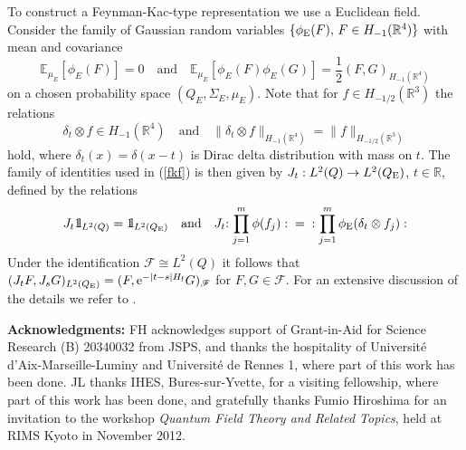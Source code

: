 \documentclass[11pt]{article}
\def\bbbone{{\mathchoice {\rm 1\mskip-4mu l} {\rm 1\mskip-4mu l}
{\rm 1\mskip-4.5mu l} {\rm 1\mskip-5mu l}}}
\def\one{\bbbone}
\newcommand{\Ebb}{{\mathbb E}}
\providecommand{\BR}{{\mathbb{R}^3 }}
\providecommand{\RR}{\mathbb{R}}
\providecommand{\kak}[1]{(\ref{#1})}
\providecommand{\fff}{\mathscr{F}}
\providecommand{\hf}{H_{\rm f}}
\providecommand{\half}{\frac{1}{2}}
\providecommand{\e}{{\rm e}}
\providecommand{\1}{\mathbb{1}}
\begin{document}
To construct a Feynman-Kac-type representation we use a Euclidean field. Consider the family of Gaussian random
variables $\{\phi_{\rm E}(F), \, F\in H_{-1}(\RR^4)\}$ with mean and covariance
$$
\Ebb_{\mu_E}[\phi_E(F)]=0 \quad \mbox{and} \quad \Ebb_{\mu_E}[\phi_E(F)\phi_E(G)]=\half (F, G)_{H_{-1}(\RR^4)}
$$
on a chosen probability space $(Q_E, \Sigma_E, \mu_E)$. Note that for $f\in H_{-1/2}(\BR)$ the relations
$$
\delta_t\otimes f\in H_{-1}(\RR^4) \quad  \mbox{and} \quad \|\delta_t\otimes f\|_{H_{-1}(\RR^4)} =
\|f\|_{H_{-1/2}(\BR)}
$$
hold, where $\delta_t(x) = \delta(x-t)$ is Dirac delta distribution with mass on $t$. The family of identities
used in \kak{fkf}
is  then given by $J_t: L^2(Q)\to L^2(Q_{\rm E})$, $t\in\RR$, defined by the relations
$$
J_t \one_{L^2(Q)}=\one_{L^2(Q_{\rm E})} \quad \mbox{and} \quad
J_t {:\prod_{j=1}^m \phi(f_j):} \;=\; {:\prod_{j=1}^m \phi_{\rm E}(\delta_t\otimes f_j):}
$$
Under the identification $\fff\cong L^2(Q)$ it follows that $(J_t F, J_s G)_{L^2(Q_{\rm E})}=
(F, \e^{-|t-s|\hf }G)_\fff$ for $F, G\in\fff$. For an extensive discussion of the details we refer to
\cite[Chapter 5]{lhb11}.


\bigskip
\noindent
{\bf Acknowledgments:}
FH acknowledges support of Grant-in-Aid for Science Research (B) 20340032 from JSPS,
and thanks the hospitality of Universit\'e d'Aix-Marseille-Luminy and  Universit\'e de
Rennes 1, where part of this work has been  done.
JL thanks IHES, Bures-sur-Yvette, for a visiting fellowship, where part of
this work has been done, and gratefully thanks Fumio Hiroshima for an invitation to the workshop
\emph{Quantum Field Theory and Related Topics}, held at RIMS Kyoto in November 2012.
\end{document}
